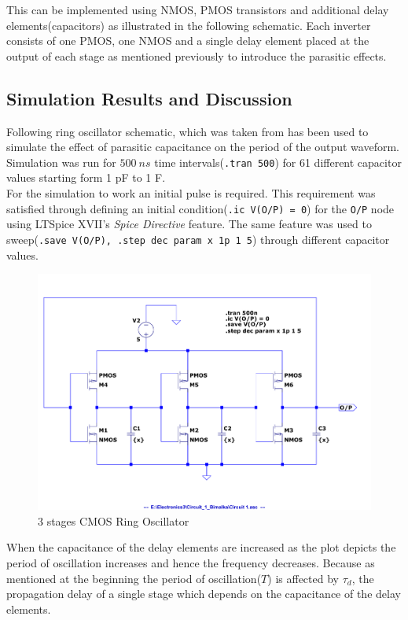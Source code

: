 \documentclass[a4paper,11pt]{article}%
\begin{document}
This can be implemented using NMOS, PMOS transistors and additional delay elements(capacitors) as illustrated in the following schematic. Each inverter consists of one PMOS, one NMOS and a single delay element placed at the output of each stage as mentioned previously to introduce the parasitic effects.


\subsection{Simulation Results and Discussion}

Following ring oscillator schematic, which was taken from\cite{article}  has been used to simulate the effect of parasitic capacitance on the period of the output waveform. Simulation was run for $500~ns$ time intervals({\tt .tran 500}) for 61 different capacitor values starting form 1 pF to 1 F.\\

For the simulation to work an initial pulse is required. This requirement was satisfied through defining an initial condition({\tt .ic V(O/P) = 0}) for the {\tt O/P} node using LTSpice XVII's \textit{Spice Directive} feature. The same feature was used  to sweep({\tt .save V(O/P), .step dec param x 1p 1 5}) through different capacitor values.


\begin{figure}[H]
	\centering
	\includegraphics[scale=0.6]{figures/cct1plot1}
	\caption{3 stages CMOS Ring Oscillator}
\end{figure}
\pagebreak
When the capacitance of the delay elements are increased as the plot depicts the period of oscillation increases and hence the frequency decreases. Because as mentioned at the beginning the period of oscillation($T$) is affected by $\tau_{d}$, the propagation delay of a single stage which depends on the capacitance of the delay elements.
\end{document}
